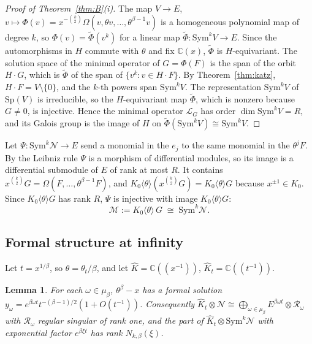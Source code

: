 \documentclass[11pt]{amsart}
\newtheorem{lemma}[thm]{Lemma}
\theoremstyle{definition}
\newcommand{\C}{\mathbb C}
\newcommand{\Sp}{\mathrm{Sp}}
\newcommand{\Sym}{\mathrm{Sym}}
\begin{document}
\begin{proof}[Proof of Theorem~\ref{thm:B}(i)]
The map $V\to E$, $v\mapsto\Phi(v)=x^{-\binom k2}\Omega(v,\theta v,\dots,\theta^{\beta-1}v)$ is a homogeneous polynomial map of degree $k$, so $\Phi(v)=\tilde\Phi(v^k)$ for a linear map $\tilde\Phi:\Sym^kV\to E$. Since the automorphisms in $H$ commute with $\theta$ and fix $\C(x)$, $\tilde\Phi$ is $H$-equivariant. The solution space of the minimal operator of $G=\Phi(F)$ is the span of the orbit $H\cdot G$, which is $\tilde\Phi$ of the span of $\{v^k:v\in H\cdot F\}$. By Theorem~\ref{thm:katz}, $H\cdot F=V\setminus\{0\}$, and the $k$-th powers span $\Sym^kV$. The representation $\Sym^kV$ of $\Sp(V)$ is irreducible, so the $H$-equivariant map $\tilde\Phi$, which is nonzero because $G\ne0$, is injective. Hence the minimal operator $\mathcal L_G$ has order $\dim\Sym^kV=R$, and its Galois group is the image of $H$ on $\tilde\Phi(\Sym^kV)\cong\Sym^kV$.
\end{proof}

Let $\Psi:\Sym^k\mathcal N\to E$ send a monomial in the $e_j$ to the same monomial in the $\theta^jF$. By the Leibniz rule $\Psi$ is a morphism of differential modules, so its image is a differential submodule of $E$ of rank at most $R$. It contains $x^{\binom k2}G=\Omega(F,\dots,\theta^{\beta-1}F)$, and $K_0\langle\theta\rangle(x^{\binom k2}G)=K_0\langle\theta\rangle G$ because $x^{\pm1}\in K_0$. Since $K_0\langle\theta\rangle G$ has rank $R$, $\Psi$ is injective with image $K_0\langle\theta\rangle G$:
\begin{equation}\label{eq:symk}
\mathcal M:=K_0\langle\theta\rangle\,G\;\cong\;\Sym^k\mathcal N .
\end{equation}

\subsection{Formal structure at infinity}
Let $t=x^{1/\beta}$, so $\theta=\theta_t/\beta$, and let $\hat K=\C((x^{-1}))$, $\hat K_t=\C((t^{-1}))$.

\begin{lemma}\label{lem:Nformal}
For each $\omega\in\mu_\beta$, $\theta^\beta-x$ has a formal solution $y_\omega=e^{\beta\omega t}t^{-(\beta-1)/2}(1+O(t^{-1}))$. Consequently $\hat K_t\otimes\mathcal N\cong\bigoplus_{\omega\in\mu_\beta}E^{\beta\omega t}\otimes\mathcal R_\omega$ with $\mathcal R_\omega$ regular singular of rank one, and the part of $\hat K_t\otimes\Sym^k\mathcal N$ with exponential factor $e^{\beta\xi t}$ has rank $N_{k,\beta}(\xi)$.
\end{lemma}
\end{document}

